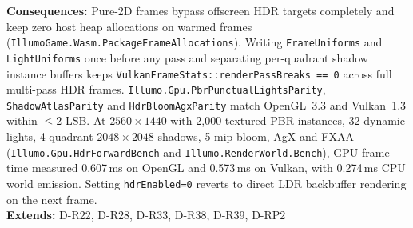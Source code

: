 \begin{decisionbox}[title={D-R41 \quad 2026-11-19}]
\textbf{Consequences:} Pure-2D frames bypass offscreen HDR targets completely
and keep zero host heap allocations on warmed frames
(\texttt{IllumoGame.Wasm.PackageFrameAllocations}). Writing
\texttt{FrameUniforms} and \texttt{LightUniforms} once before any pass and
separating per-quadrant shadow instance buffers keeps
\texttt{VulkanFrameStats::renderPassBreaks == 0} across full multi-pass HDR
frames. \texttt{Illumo.Gpu.PbrPunctualLightsParity},
\texttt{ShadowAtlasParity} and \texttt{HdrBloomAgxParity} match OpenGL~3.3 and
Vulkan~1.3 within $\le 2$ LSB. At $2560\times 1440$ with 2,000 textured PBR
instances, 32 dynamic lights, 4-quadrant $2048\times 2048$ shadows, 5-mip
bloom, AgX and FXAA (\texttt{Illumo.Gpu.HdrForwardBench} and
\texttt{Illumo.RenderWorld.Bench}), GPU frame time measured 0.607\,ms on
OpenGL and 0.573\,ms on Vulkan, with 0.274\,ms CPU world emission. Setting
\texttt{hdrEnabled=0} reverts to direct LDR backbuffer rendering on the next
frame.\\
\textbf{Extends:} D-R22, D-R28, D-R33, D-R38, D-R39, D-RP2
\end{decisionbox}
